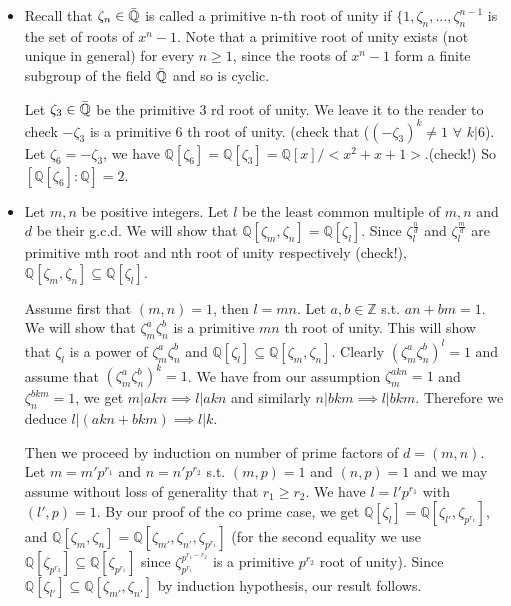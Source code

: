 \documentclass[12pt,a4paper]{article}
\begin{document}
\begin{itemize}
    \item Recall that $\zeta_n\in \mathbb{\Bar{Q}}$ is called a primitive n-th root of unity if $\{1, \zeta_n, ..., \zeta_n^{n-1}$ is the set of roots of $x^n-1$. Note that a primitive root of unity exists (not unique in general) for every $n\geq 1$, since the roots of $x^n-1$  form a finite subgroup of the field $\mathbb{\Bar{Q}}$ and so is cyclic.
    
    Let $\zeta_3\in\mathbb{\Bar{Q}}$ be the primitive 3 rd root of unity. We leave it to the reader to check $-\zeta_3$ is a primitive 6 th root of unity. (check that ($(-\zeta_3)^k\neq 1$ $\forall$ $k|6$). Let $\zeta_6=-\zeta_3$, we have $\mathbb{Q}[\zeta_6]=\mathbb{Q}[\zeta_3]=\mathbb{Q}[x]/<x^2+x+1>$.(check!) So $[\mathbb{Q}[\zeta_6]:\mathbb{Q}]=2$.
    
    \item Let $m,n$ be positive integers. Let $l$ be the least common multiple of $m,n$ and $d$ be their g.c.d. We will show that $\mathbb{Q}[\zeta_m,\zeta_n]=\mathbb{Q}[\zeta_l]$. Since $\zeta_l^{\frac{n}{d}}$ and $\zeta_l^{\frac{m}{d}}$ are primitive mth root and nth root of unity respectively (check!),  $\mathbb{Q}[\zeta_m,\zeta_n]\subseteq \mathbb{Q}[\zeta_l]$. 
    
          Assume first that $(m,n)=1$, then $l=mn$. Let $a,b\in \mathbb{Z}$ s.t. $an+bm=1$. We will show that $\zeta_m^a\zeta_n^b$ is a primitive $mn$ th root of unity. This will show that $\zeta_l$ is a power of $\zeta_m^a\zeta_n^b$ and $\mathbb{Q}[\zeta_l]\subseteq \mathbb{Q}[\zeta_m,\zeta_n]$. Clearly $(\zeta_m^a\zeta_n^b)^l=1$ and assume that $(\zeta_m^a\zeta_n^b)^k=1$. We have from our assumption $\zeta_m^{akn}=1$ and $\zeta_n^{bkm}=1$, we get $m|akn\implies l|akn$ and similarly $n|bkm\implies l|bkm$. Therefore we deduce $l|(akn+bkm)\implies l|k$.
          
          Then we proceed by induction on number of prime factors of $d=(m,n)$. Let $m=m'p^{r_1}$ and $n=n'p^{r_2}$ s.t. $(m,p)=1$ and $(n,p)=1$ and we may assume without loss of generality that $r_1\geq r_2$. We have $l=l'p^{r_1}$ with $(l',p)=1$. By our proof of the co prime case, we get $\mathbb{Q}[\zeta_l]= \mathbb{Q}[\zeta_{l'},\zeta_{p^{r_1}}]$, and $\mathbb{Q}[\zeta_m,\zeta_n]=\mathbb{Q}[\zeta_{m'},\zeta_{n'}, \zeta_{p^{r_1}}]$ (for the second equality we use $\mathbb{Q}[\zeta_{p^{r_2}}]\subseteq \mathbb{Q}[\zeta_{p^{r_1}}]$ since $\zeta_{p^{r_1}}^{p^{r_1-r_2}}$ is a primitive $p^{r_2}$ root of unity). Since $\mathbb{Q}[\zeta_{l'}]\subseteq \mathbb{Q}[\zeta_{m'},\zeta_{n'}]$ by induction hypothesis, our result follows. 
\end{itemize}{}
\end{document}
